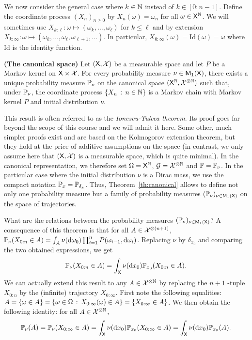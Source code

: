 \documentclass[english,graybox,envcountchap,envcountsame,sectrefs,shortlabels]{svmono}
\theoremstyle{style}
\newcommand{\bs}{\begin{shaded}}
\newcommand{\es}{\end{shaded}}
\begin{document}
We now consider the general case where $k\in\mathbb{N}$ instead of $k\in[0:n-1]$.
Define the coordinate process $(X_{n})_{n\geq 0}$ by $X_{n}(\omega)=\omega_{n}$
for all $\omega\in\mathsf{X}^{\mathbb{N}}$. We will sometimes use $X_{k:\ell}:\omega\mapsto(\omega_{k},\ldots,\omega_{\ell})$
for $k\leq\ell$ and by extension $X_{k:\infty}:\omega\mapsto(\omega_{k},\ldots,\omega_{\ell},\omega_{\ell+1},\dots)$.
In particular, $X_{0:\infty}(\omega)=\mathrm{Id}(\omega)=\omega$ where $\mathrm{Id}$
is the identity function.
\begin{theorem}
\label{th:canonical}
\textbf{(The canonical space)} Let $(\mathsf{X},\mathcal{X})$ be a measurable
space and let $P$ be a Markov kernel on $\mathsf{X}\times\mathcal{X}$. For
every probability measure $\nu\in\mathsf{M}_{1}(\mathsf{X})$, there exists a
unique probability measure $\mathbb{P}_{\nu}$ on the canonical space $(\mathsf{X}^{\mathbb{N}},\mathcal{X}^{\otimes\mathbb{N}})$
such that, under $\mathbb{P}_{\nu}$, the coordinate process $\left\{ X_{n}\,:\,n\in\mathbb{N}\right\}$
is a Markov chain with Markov kernel $P$ and initial distribution
$\nu$.
\end{theorem}
This result is often referred to as the \emph{Ionescu-Tulcea
theorem}. Its proof goes far beyond the scope of this course and we
will admit it here. Some other, much simpler proofs exist and are
based on the Kolmogorov extension theorem, but they hold at the price
of additive assumptions on the space (in contrast, we only assume
here that $(\mathsf{X},\mathcal{X})$ is a measurable space, which is quite
minimal). In the canonical representation, we therefore set $\Omega=\mathsf{X}^{\mathbb{N}}$,
$\mathcal{G}=\mathcal{X}^{\otimes\mathbb{N}}$ and $\mathbb{P}=\mathbb{P}_{\nu}$. In the particular
case where the initial distribution $\nu$ is a Dirac mass, we use
the compact notation $\mathbb{P}_{x}=\mathbb{P}_{\delta_{x}}$. Thus, Theorem~\ref{th:canonical} allows to define not only one probability measure but a family
of probability measures $(\mathbb{P}_{\nu})_{\nu\in\mathsf{M}_{1}(\mathsf{X})}$ on the
space of trajectories.

What are the relations between the probability measures $(\mathbb{P}_{\nu})_{\nu\in\mathsf{M}_{1}(\mathsf{X})}$?
A consequence of this theorem is that for all $A\in\mathcal{X}^{\otimes(n+1)}$,
$\mathbb{P}_{\nu}(X_{0:n}\in A)=\int_{A}\nu(\mathrm{d}\omega_{0})\prod_{i=1}^{n}P(\omega_{i-1},\mathrm{d}\omega_{i})$.
Replacing $\nu$ by $\delta_{x_{0}}$ and comparing the two obtained
expressions, we get
\[
\mathbb{P}_{\nu}(X_{0:n}\in A)=\int_{\mathsf{X}}\nu(\mathrm{d} x_{0})\mathbb{P}_{x_{0}}(X_{0:n}\in A).
\]
We can actually extend this result to any $A\in\mathcal{X}^{\otimes\mathbb{N}}$
by replacing the $n+1$ -tuple $X_{0:n}$ by the (infinite) trajectory
$X_{0:\infty}$. First note the following equalities: $A=\left\{ \omega\in A\right\} =\left\{ \omega\in\Omega\,:\,X_{0:\infty}(\omega)\in A\right\}=\left\{ X_{0:\infty}\in A\right\} $. We then obtain the following identity: for all $A\in\mathcal{X}^{\otimes\mathbb{N}}$,
\begin{equation}
\mathbb{P}_{\nu}(A)=\mathbb{P}_{\nu}(X_{0:\infty}\in A)=\int_{\mathsf{X}}\nu(\mathrm{d} x_{0})\mathbb{P}_{x_{0}}(X_{0:\infty}\in A)=\int_{\mathsf{X}}\nu(\mathrm{d} x_{0})\mathbb{P}_{x_{0}}(A).\label{eq:relation:P}
\end{equation}
\end{document}
